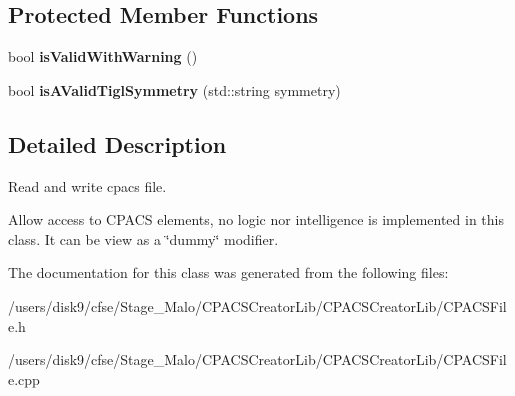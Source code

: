 \subsection*{Protected Member Functions}
\begin{DoxyCompactItemize}
\item 
\hypertarget{classcpcr_1_1CPACSFile_a1b9fd38919af9f14e518173b90d8e9a4}{bool {\bfseries is\-Valid\-With\-Warning} ()}\label{classcpcr_1_1CPACSFile_a1b9fd38919af9f14e518173b90d8e9a4}

\item 
\hypertarget{classcpcr_1_1CPACSFile_ac55592f448c5dbc09b6eb9d866cd2dbd}{bool {\bfseries is\-A\-Valid\-Tigl\-Symmetry} (std\-::string symmetry)}\label{classcpcr_1_1CPACSFile_ac55592f448c5dbc09b6eb9d866cd2dbd}

\end{DoxyCompactItemize}


\subsection{Detailed Description}
Read and write cpacs file.

Allow access to C\-P\-A\-C\-S elements, no logic nor intelligence is implemented in this class. It can be view as a \char`\"{}dummy\char`\"{} modifier. 

The documentation for this class was generated from the following files\-:\begin{DoxyCompactItemize}
\item 
/users/disk9/cfse/\-Stage\-\_\-\-Malo/\-C\-P\-A\-C\-S\-Creator\-Lib/\-C\-P\-A\-C\-S\-Creator\-Lib/C\-P\-A\-C\-S\-File.\-h\item 
/users/disk9/cfse/\-Stage\-\_\-\-Malo/\-C\-P\-A\-C\-S\-Creator\-Lib/\-C\-P\-A\-C\-S\-Creator\-Lib/C\-P\-A\-C\-S\-File.\-cpp\end{DoxyCompactItemize}

